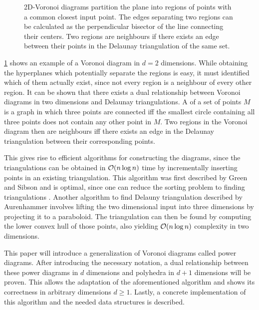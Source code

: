 \begin{figure}[tb]
    \caption{2D-Voronoi diagrams partition the plane into regions of points with a common closest input point. The edges separating two regions can be calculated as the perpendicular bisector of the line connecting their centers. Two regions are neighbours if there exists an edge between their points in the Delaunay triangulation of the same set.}
    \label{fig:voronoi}
\end{figure}

\cref{fig:voronoi} shows an example of a Voronoi diagram in $d = 2$ dimensions.
While obtaining the hyperplanes which potentially separate the regions is easy, it must identified which of them actually exist, since not every region is a neighbour of every other region.
It can be shown \cite{aurenhammer1991voronoi} that there exists a dual relationship between Voronoi diagrams in two dimensions and Delaunay triangulations.
A  of a set of points $M$ is a graph in which three points are connected iff the smallest circle containing all three points does not contain any other point in $M$.
Two regions in the Voronoi diagram then are neighbours iff there exists an edge in the Delaunay triangulation between their corresponding points.

This gives rise to efficient algorithms for constructing the diagrams, since the triangulations can be obtained in $\mathcal{O}(n \log n)$ time by incrementally inserting points in an existing triangulation.
This algorithm was first described by Green and Sibson \cite{green1978computing} and is optimal, since one can reduce the sorting problem to finding triangulations \cite{aurenhammer1991voronoi}.
Another algorithm to find Delauny triangulation described by Aurenhammer involves lifting the two dimensional input into three dimensions by projecting it to a paraboloid.
The triangulation can then be found by computing the lower convex hull of those points, also yielding $\mathcal{O}(n \log n)$ complexity in two dimensions.

This paper will introduce a generalization of Voronoi diagrams called power diagrams.
After introducing the necessary notation, a dual relationship between these power diagrams in $d$ dimensions and polyhedra in $d+1$ dimensions will be proven.
This allows the adaptation of the aforementioned algorithm and shows its correctness in arbitrary dimensions $d \geq 1$.
Lastly, a concrete implementation of this algorithm and the needed data structures is described.

